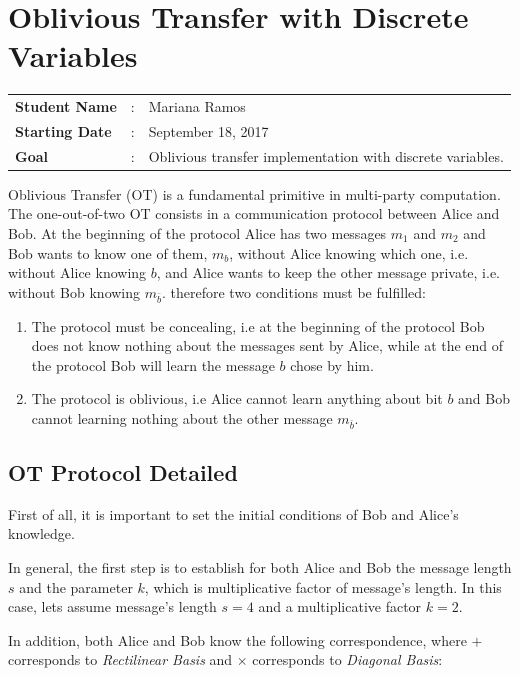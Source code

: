 \clearpage
\section{Oblivious Transfer with Discrete Variables}

\begin{tcolorbox}	
\begin{tabular}{p{2.75cm} p{0.2cm} p{10.5cm}} 	
\textbf{Student Name}  &:& Mariana Ramos\\
\textbf{Starting Date} &:& September 18, 2017\\
\textbf{Goal}          &:& Oblivious transfer implementation with discrete variables.
\end{tabular}
\end{tcolorbox}

Oblivious Transfer (OT) is a fundamental primitive in multi-party computation. The one-out-of-two OT consists in a communication protocol between Alice and Bob. At the beginning of the protocol Alice has two messages $m_1$ and $m_2$ and Bob wants to know one of them, $m_b$, without Alice knowing which one, i.e. without Alice knowing $b$, and Alice wants to keep the other message private, i.e. without Bob knowing $m_{\bar{b}}$. therefore two conditions must be fulfilled:
\begin{enumerate}
	\item{The protocol must be concealing, i.e at the beginning of the protocol Bob does not know nothing about the messages sent by Alice, while at the end of the protocol Bob will learn the message $b$ chose by him.}
	\item{The protocol is oblivious, i.e Alice cannot learn anything about bit $b$ and Bob cannot learning nothing about the other message $m_{\bar{b}}$.}
\end {enumerate}

\subsection{OT Protocol Detailed}

 First of all, it is important to set the initial conditions of Bob and Alice's knowledge.

In general, the first step is to establish for both Alice and Bob the message length $s$ and the parameter $k$, which is multiplicative factor of message's length.
In this case, lets assume message's length $s=4$ and a multiplicative factor $k=2$.

 In addition, both Alice and Bob know the following correspondence, where $+$ corresponds to \textit{Rectilinear Basis} and $\times$ corresponds to \textit{Diagonal Basis}:

